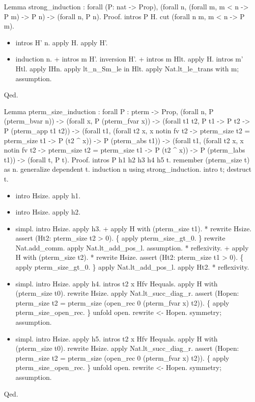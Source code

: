 Lemma strong\_induction :
 forall (P: nat -> Prop),
   (forall n, (forall m, m < n -> P m) -> P n) ->
   (forall n, P n).
Proof.
  intros P H.
  cut (forall n m, m < n -> P m).

\begin{itemize}
\item  intros H' n.
    apply H.
    apply H'.

\item  induction n.
    + intros m H'.
      inversion H'.
    + intros m Hlt.
      apply H.
      intros m' Htl.
      apply IHn.
      apply lt\_n\_Sm\_le in Hlt.
      apply Nat.lt\_le\_trans with m; assumption.

\end{itemize}
Qed.


Lemma pterm\_size\_induction :
 forall P : pterm -> Prop,
 (forall n, P (pterm\_bvar n)) ->
 (forall x, P (pterm\_fvar x)) ->
 (forall t1 t2, P t1 -> P t2 -> P (pterm\_app t1 t2)) ->
 (forall t1,
    (forall t2 x, x notin fv t2 -> pterm\_size t2 = pterm\_size t1 ->
    P (t2 \^{} x)) -> P (pterm\_abs t1)) ->
 (forall t1,
    (forall t2 x, x notin fv t2 -> pterm\_size t2 = pterm\_size t1 ->
    P (t2 \^{} x)) -> P (pterm\_labs t1)) ->
 (forall t, P t).
Proof.
  intros P h1 h2 h3 h4 h5 t.
  remember (pterm\_size t) as n.
  generalize dependent t.
  induction n using strong\_induction.
  intro t; destruct t.

\begin{itemize}
\item  intro Hsize.
    apply h1.

\item  intro Hsize.
    apply h2.

\item  simpl.
    intro Hsize.
    apply h3.
    + apply H with (pterm\_size t1).
      * rewrite Hsize.
        assert (Ht2: pterm\_size t2 > 0).
        \{
          apply pterm\_size\_gt\_0.
        \}
        rewrite Nat.add\_comm.
        apply Nat.lt\_add\_pos\_l.
        assumption.
      * reflexivity.
    + apply H with (pterm\_size t2).
      * rewrite Hsize.
        assert (Ht2: pterm\_size t1 > 0).
        \{
          apply pterm\_size\_gt\_0.
        \}
        apply Nat.lt\_add\_pos\_l.
        apply Ht2.
      * reflexivity.

\item  simpl.
    intro Hsize.
    apply h4.
    intros t2 x Hfv Hequals.
    apply H with (pterm\_size t0).
    rewrite Hsize.
    apply Nat.lt\_succ\_diag\_r.
    assert (Hopen: pterm\_size t2 = pterm\_size (open\_rec 0 (pterm\_fvar x) t2)).
    \{
      apply pterm\_size\_open\_rec.
    \}
    unfold open.
    rewrite <- Hopen.
    symmetry; assumption.

\item  simpl.
    intro Hsize.
    apply h5.
    intros t2 x Hfv Hequals.
    apply H with (pterm\_size t0).
    rewrite Hsize.
    apply Nat.lt\_succ\_diag\_r.
    assert (Hopen: pterm\_size t2 = pterm\_size (open\_rec 0 (pterm\_fvar x) t2)).
    \{
      apply pterm\_size\_open\_rec.
    \}
    unfold open.
    rewrite <- Hopen.
    symmetry; assumption.

\end{itemize}
Qed.


